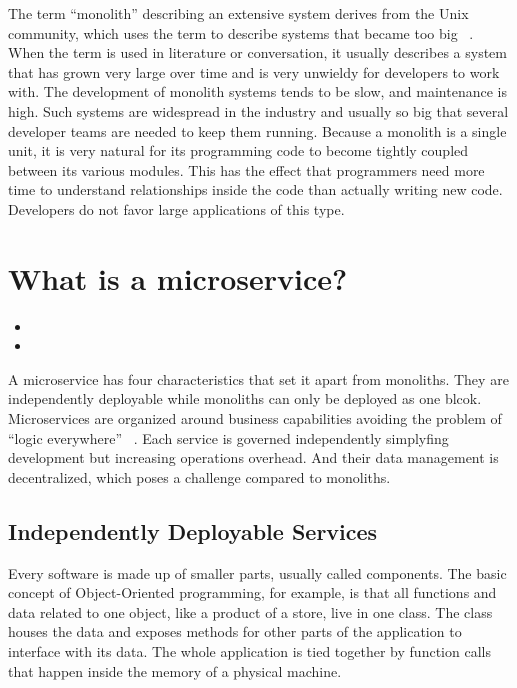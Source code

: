 The term ``monolith'' describing an extensive system derives from the Unix community, which uses the term to describe systems that became too big ~\cite{raymond.2003}. When the term is used in literature or conversation, it usually describes a system that has grown very large over time and is very unwieldy for developers to work with. The development of monolith systems tends to be slow, and maintenance is high. Such systems are widespread in the industry and usually so big that several developer teams are needed to keep them running. Because a monolith is a single unit, it is very natural for its programming code to become tightly coupled between its various modules. This has the effect that programmers need more time to understand relationships inside the code than actually writing new code. Developers do not favor large applications of this type.



\section{What is a microservice?}
\label{sec:theory:what}

\begin{itemize}
  \item {}
  \item {}
\end{itemize}

A microservice has four characteristics that set it apart from monoliths. They are independently deployable while monoliths can only be deployed as one blcok. Microservices are organized around business capabilities avoiding the problem of ``logic everywhere'' ~\cite{microservices.2014}. Each service is governed independently simplyfing development but increasing operations overhead. And their data management is decentralized, which poses a challenge compared to monoliths.

\subsection{Independently Deployable Services}

Every software is made up of smaller parts, usually called components. The basic concept of Object-Oriented programming, for example, is that all functions and data related to one object, like a product of a store, live in one class. The class houses the data and exposes methods for other parts of the application to interface with its data. The whole application is tied together by function calls that happen inside the memory of a physical machine.

